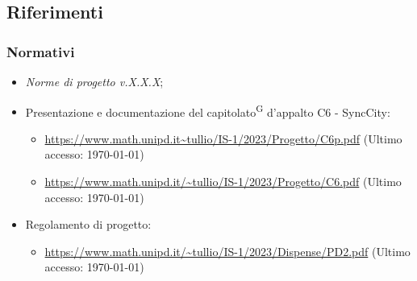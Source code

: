 \documentclass[8pt]{article}
\newcommand{\glossterm}[1]{#1\textsuperscript{G}} %
\begin{document}
\subsection{Riferimenti}
\subsubsection{Normativi}
\begin{itemize}
	\item \textit{Norme di progetto v.X.X.X};
	\item Presentazione e documentazione del \glossterm{capitolato} d’appalto C6 - SyncCity:
	\begin{itemize}
		\item \href{https://www.math.unipd.it/~tullio/IS-1/2023/Progetto/C6p.pdf}{\color{myblue}https://www.math.unipd.it\textasciitilde{}tullio/IS-1/2023/Progetto/C6p.pdf} (Ultimo accesso: \today)
		\item \href{https://www.math.unipd.it/~tullio/IS-1/2023/Progetto/C6.pdf}{\color{myblue}https://www.math.unipd.it/\textasciitilde{}tullio/IS-1/2023/Progetto/C6.pdf} (Ultimo accesso: \today)
	\end{itemize}
	\item Regolamento di progetto:
	\begin{itemize}
		\item \href{https://www.math.unipd.it/~tullio/IS-1/2023/Dispense/PD2.pdf}{\color{myblue}https://www.math.unipd.it/\textasciitilde{}tullio/IS-1/2023/Dispense/PD2.pdf} (Ultimo accesso: \today)
	\end{itemize}
\end{itemize}
\clearpage
\end{document}
